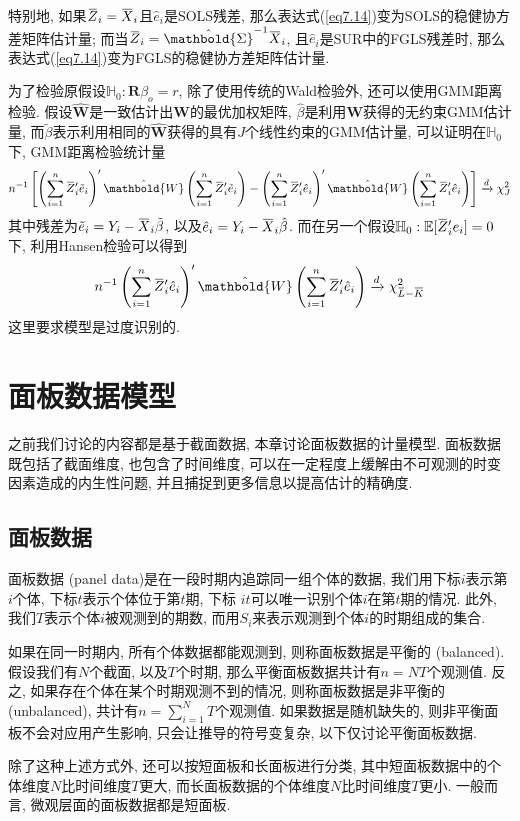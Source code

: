 \documentclass[cn, 12pt, math=mtpro2, bibstyle=apa, blue, twocol]{elegantbook}
\newcommand{\RH}{\mathbold{R}}
\newcommand{\E}{\mathbb{E}}
\newcommand{\W}{\mathbold{W}}
\newcommand{\hb}{\hat{\beta}}
\newcommand{\HH}{\mathbb{H}}
\newcommand{\OX}{\overbar{X}}
\newcommand{\BS}{\mathbold{\Sigma}}
\newcommand{\overbar}[1]{\mkern 1.5mu\overline{\mkern-1.5mu#1\mkern-1.5mu}\mkern 1.5mu}
\begin{document}
特别地, 如果$\overbar{Z}_i=\overbar{X}_i$且$\hat{e}_i$是SOLS残差, 那么表达式(\ref{eq7.14})变为SOLS的稳健协方差矩阵估计量; 而当$\overbar{Z}_i=\hat{\BS}^{-1}\overbar{X}_i$, 且$\hat{e}_i$是SUR中的FGLS残差时, 那么表达式(\ref{eq7.14})变为FGLS的稳健协方差矩阵估计量.

为了检验原假设$\HH_0:\RH\beta_o=r$, 除了使用传统的Wald检验外, 还可以使用GMM距离检验. 假设$\hat{\W}$是一致估计出$\W$的最优加权矩阵, $\hb$是利用$\W$获得的无约束GMM估计量, 而$\tilde{\beta}$表示利用相同的$\hat{\W}$获得的具有$J$个线性约束的GMM估计量, 可以证明在$\HH_0$下, GMM距离检验统计量
$$n^{-1}\left[\left(\sum_{i=1}^{n}\overbar{Z}_i'\tilde{e}_i\right)'\hat{\W}\left(\sum_{i=1}^{n}\overbar{Z}_i'\tilde{e}_i\right)-\left(\sum_{i=1}^{n}\overbar{Z}_i'\hat{e}_i\right)'\hat{\W}\left(\sum_{i=1}^{n}\overbar{Z}_i'\hat{e}_i\right)\right]\xrightarrow{d}\chi_J^2$$
其中残差为$\tilde{e}_i=Y_i-\overbar{X}_i\tilde{\beta}$, 以及$\hat{e}_i=Y_i-\OX_i\hb$. 而在另一个假设$\HH_0:\E[\overbar{Z}_i'e_i]=0$下, 利用Hansen检验可以得到
$$n^{-1}\left(\sum_{i=1}^{n}\overbar{Z}_i'\hat{e}_i\right)'\hat{\W}\left(\sum_{i=1}^{n}\overbar{Z}_i'\hat{e}_i\right)\xrightarrow{d}\chi^2_{\overbar{L}-\overbar{K}}$$
这里要求模型是过度识别的.

\chapter{面板数据模型}
之前我们讨论的内容都是基于截面数据, 本章讨论面板数据的计量模型. 面板数据既包括了截面维度, 也包含了时间维度, 可以在一定程度上缓解由不可观测的时变因素造成的内生性问题, 并且捕捉到更多信息以提高估计的精确度.
\section{面板数据}
面板数据 (panel data)是在一段时期内追踪同一组个体的数据, 我们用下标$i$表示第$i$个体, 下标$t$表示个体位于第$t$期, 下标 $it$可以唯一识别个体$i$在第$t$期的情况. 此外, 我们$T$表示个体$i$被观测到的期数, 而用$S_i$来表示观测到个体$i$的时期组成的集合.

如果在同一时期内, 所有个体数据都能观测到, 则称面板数据是平衡的 (balanced). 假设我们有$N$个截面, 以及$T$个时期, 那么平衡面板数据共计有$n=NT$个观测值. 反之, 如果存在个体在某个时期观测不到的情况, 则称面板数据是非平衡的 (unbalanced), 共计有$n=\sum_{i=1}^{N}T$个观测值. 如果数据是随机缺失的, 则非平衡面板不会对应用产生影响, 只会让推导的符号变复杂, 以下仅讨论平衡面板数据.

除了这种上述方式外, 还可以按短面板和长面板进行分类, 其中短面板数据中的个体维度$N$比时间维度$T$更大, 而长面板数据的个体维度$N$比时间维度$T$更小. 一般而言, 微观层面的面板数据都是短面板.
\end{document}
